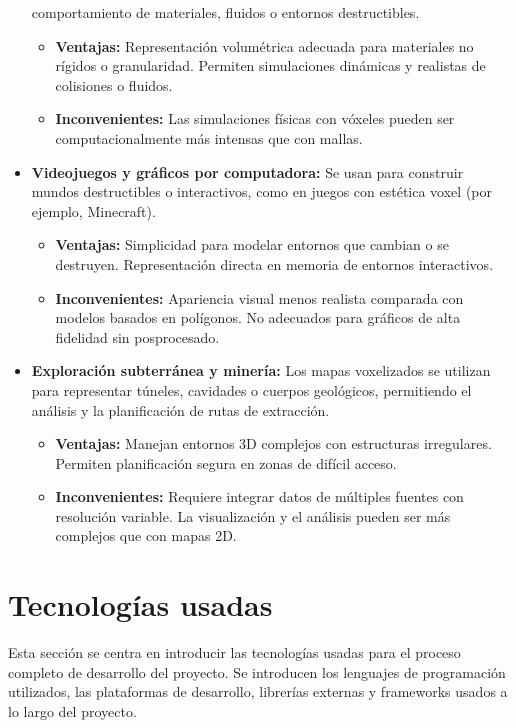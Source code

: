 \documentclass[12pt, a4paper, twoside]{article}
\begin{document}
\begin{itemize}
  comportamiento de materiales, fluidos o entornos destructibles.
  \begin{itemize}
    \item \textbf{Ventajas:} Representación volumétrica adecuada para materiales no rígidos o granularidad. Permiten simulaciones 
    dinámicas y realistas de colisiones o fluidos.
    \item \textbf{Inconvenientes:} Las simulaciones físicas con vóxeles pueden ser computacionalmente más intensas que con mallas.
  \end{itemize}
  \item \textbf{Videojuegos y gráficos por computadora:} Se usan para construir mundos destructibles o interactivos, como en 
  juegos con estética voxel (por ejemplo, Minecraft).
  \begin{itemize}
    \item \textbf{Ventajas:} Simplicidad para modelar entornos que cambian o se destruyen. Representación directa en memoria 
    de entornos interactivos.
    \item \textbf{Inconvenientes:} Apariencia visual menos realista comparada con modelos basados en polígonos. No adecuados 
    para gráficos de alta fidelidad sin posprocesado.
  \end{itemize}
  \item \textbf{Exploración subterránea y minería:} Los mapas voxelizados se utilizan para representar túneles, cavidades o 
  cuerpos geológicos, permitiendo el análisis y la planificación de rutas de extracción.
  \begin{itemize}
    \item \textbf{Ventajas:} Manejan entornos 3D complejos con estructuras irregulares. Permiten planificación segura en 
    zonas de difícil acceso.
    \item \textbf{Inconvenientes:} Requiere integrar datos de múltiples fuentes con resolución variable. La visualización y 
    el análisis pueden ser más complejos que con mapas 2D.
  \end{itemize}
\end{itemize}

\section{Tecnologías usadas}
Esta sección se centra en introducir las tecnologías usadas para el proceso completo de desarrollo del proyecto. 
Se introducen los lenguajes de programación utilizados, las plataformas de desarrollo, librerías externas y frameworks usados
a lo largo del proyecto.
\end{document}
